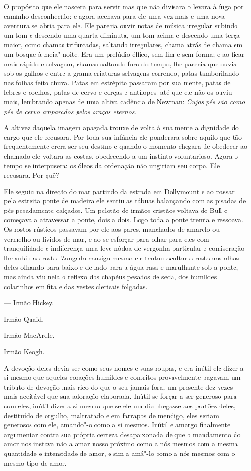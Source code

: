 O propósito que ele nascera para servir mas que não divisara o levara à
fuga por caminho desconhecido: e agora acenava para ele uma vez mais e
uma nova aventura se abria para ele. Ele parecia ouvir notas de música
irregular subindo um tom e descendo uma quarta diminuta, um tom acima e
descendo uma terça maior, como chamas trifurcadas, saltando
irregulares, chama atrás de chama em um bosque à meia"-noite. Era um
prelúdio élfico, sem fim e sem forma; e ao ficar mais rápido e
selvagem, chamas saltando fora do tempo, lhe parecia que ouvia sob os
galhos e entre a grama criaturas selvagens correndo, patas tamborilando
nas folhas feito chuva. Patas em estrépito passaram por sua mente,
patas de lebres e coelhos, patas de cervo e corças e antílopes, até que
ele não os ouviu mais, lembrando apenas de uma altiva cadência de
Newman: \textit{Cujos pés são como pés de cervo amparados pelos braços 
eternos.}

A altivez daquela imagem apagada trouxe de volta à sua mente a dignidade
do cargo que ele recusara. Por toda sua infância ele ponderara sobre
aquilo que tão frequentemente crera ser seu destino e quando o
momento chegara de obedecer ao chamado ele voltara as costas,
obedecendo a um instinto voluntarioso. Agora o tempo se interpusera: os
óleos da ordenação não ungiriam seu corpo. Ele recusara. Por quê?

Ele seguiu na direção do mar partindo da estrada em Dollymount e ao
passar pela estreita ponte de madeira ele sentiu as tábuas balançando
com as pisadas de pés pesadamente calçados. Um pelotão de irmãos
cristãos voltava de Bull e começava a atravessar a ponte, dois a dois.
Logo toda a ponte tremia e ressoava. Os rostos rústicos passavam por
ele aos pares, manchados de amarelo ou vermelho ou lívidos de mar, e ao
se esforçar para olhar para eles com tranquilidade e indiferença uma
leve nódoa de vergonha particular e comiseração lhe subiu ao rosto.
Zangado consigo mesmo ele tentou ocultar o rosto aos olhos deles
olhando para baixo e de lado para a água rasa e marulhante sob a ponte,
mas ainda viu nela o reflexo dos chapéus pesados de seda, dos
humildes colarinhos em fita e das vestes clericais folgadas.

 --- Irmão Hickey.

Irmão Quaid.

Irmão MacArdle.

Irmão Keogh.

A devoção deles devia ser como seus nomes e suas roupas, e era inútil
ele dizer a si mesmo que aqueles corações humildes e contritos
provavelmente pagavam um tributo de devoção mais rico do que o seu
jamais fora, um presente dez vezes mais aceitável que sua adoração
elaborada. Inútil se forçar a ser generoso para com eles, inútil dizer
a si mesmo que se ele um dia chegasse aos portões deles, destituído de
orgulho, maltratado e em farrapos de mendigo, eles seriam generosos com
ele, amando"-o como a si mesmos. Inútil e amargo finalmente argumentar
contra sua própria certeza desapaixonada de que o mandamento do amor nos
instava não a amar nosso próximo como a nós mesmos com a mesma
quantidade e intensidade de amor, e sim a amá"-lo como a nós mesmos
com o mesmo tipo de amor.

